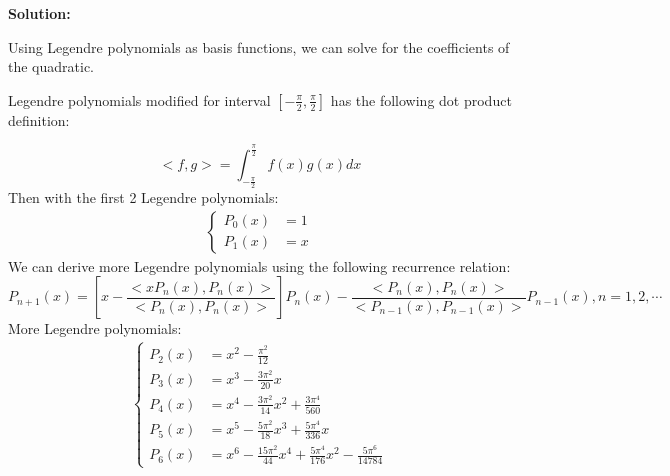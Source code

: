 \documentclass[conference,onecolumn]{IEEEtran}
\begin{document}
\begin{enumerate}[label=\arabic{enumi}.]
\begin{enumerate}
                        \textbf{Solution:}

                        Using Legendre polynomials as basis functions, we can solve for the coefficients of the quadratic.

                        Legendre polynomials modified for interval $[-\frac{\pi}{2}, \frac{\pi}{2}]$ has the following dot product definition:

                        $$
                              <f, g> = \int_{-\frac{\pi}{2}}^{\frac{\pi}{2}} f(x) g(x) dx
                        $$
                        Then with the first 2 Legendre polynomials:
                        \begin{align*}
                              \begin{cases}
                                    P_0(x) & = 1 \\
                                    P_1(x) & = x
                              \end{cases}
                        \end{align*}
                        We can derive more Legendre polynomials using the following recurrence relation:
                        $$
                              P_{n + 1}(x) = \left[ x - \frac{<x P_n(x), P_n(x)>}{<P_n(x), P_n(x)>}\right] P_n(x) - \frac{<P_n(x), P_n(x)>}{<P_{n - 1}(x), P_{n - 1}(x)>} P_{n - 1}(x), n = 1, 2, \cdots
                        $$
                        More Legendre polynomials:
                        \begin{align*}
                              \begin{cases}
                                    P_2(x) & = x^2 - \frac{\pi^2}{12}                                                       \\
                                    P_3(x) & = x^3 - \frac{3\pi^2}{20} x                                                    \\
                                    P_4(x) & = x^4 - \frac{3\pi^2}{14} x^2 + \frac{3\pi^4}{560}                             \\
                                    P_5(x) & = x^5 - \frac{5\pi^2}{18} x^3 + \frac{5\pi^4}{336} x                           \\
                                    P_6(x) & = x^6 - \frac{15\pi^2}{44} x^4 + \frac{5\pi^4}{176} x^2 - \frac{5\pi^6}{14784}
                              \end{cases}
                        \end{align*}

\end{enumerate}
\end{enumerate}
\end{document}
